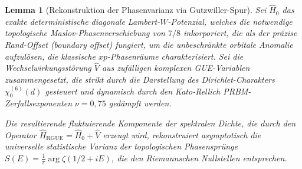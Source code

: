 \documentclass[aps,prl,preprint,superscriptaddress,floatfix]{revtex4-2}
\newtheorem{lemma}[theorem]{Lemma}
\begin{document}
\begin{lemma}[Rekonstruktion der Phasenvarianz via Gutzwiller-Spur]
\label{lemma:phase_absorption_formal_gutzwiller}
Sei $\hat{H}_0$ das exakte deterministische diagonale Lambert-$W$-Potenzial, welches die notwendige topologische Maslov-Phasenverschiebung von $7/8$ inkorporiert, die als der präzise Rand-Offset (\textit{boundary offset}) fungiert, um die unbeschränkte orbitale Anomalie aufzulösen, die klassische $xp$-Phasenräume charakterisiert. Sei die Wechselwirkungsstörung $\hat{V}$ aus zufälligen komplexen GUE-Variablen zusammengesetzt, die strikt durch die Darstellung des Dirichlet-Charakters $\chi_0^{(6)}(d)$ gesteuert und dynamisch durch den Kato-Rellich PRBM-Zerfallsexponenten $\nu = 0,75$ gedämpft werden.

Die resultierende fluktuierende Komponente der spektralen Dichte, die durch den Operator $\hat{H}_{\text{RGUE}} = \hat{H}_0 + \hat{V}$ erzeugt wird, rekonstruiert asymptotisch die universelle statistische Varianz der topologischen Phasensprünge $S(E) = \frac{1}{\pi} \arg \zeta(1/2+iE)$, die den Riemannschen Nullstellen entsprechen.
\end{lemma}
\end{document}
